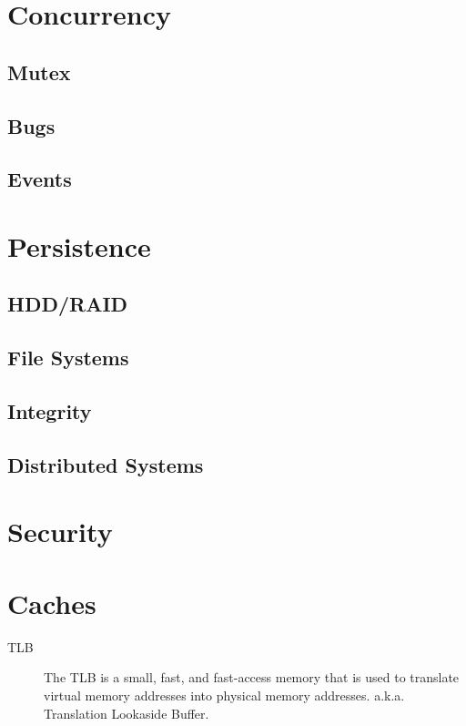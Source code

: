 \documentclass{article}
\begin{document}
\section{Concurrency}
    \subsection{Mutex}
    \subsection{Bugs}
    \subsection{Events}
\section{Persistence}
    \subsection{HDD/RAID}
    \subsection{File Systems}
    \subsection{Integrity}
    \subsection{Distributed Systems}
\section{Security}
\section{Caches}
    \begin{description}
      \item[TLB]
        The TLB is a small, fast, and fast-access memory that is used to translate virtual memory addresses into physical memory addresses. a.k.a. Translation Lookaside Buffer.
    \end{description}
\end{document}
